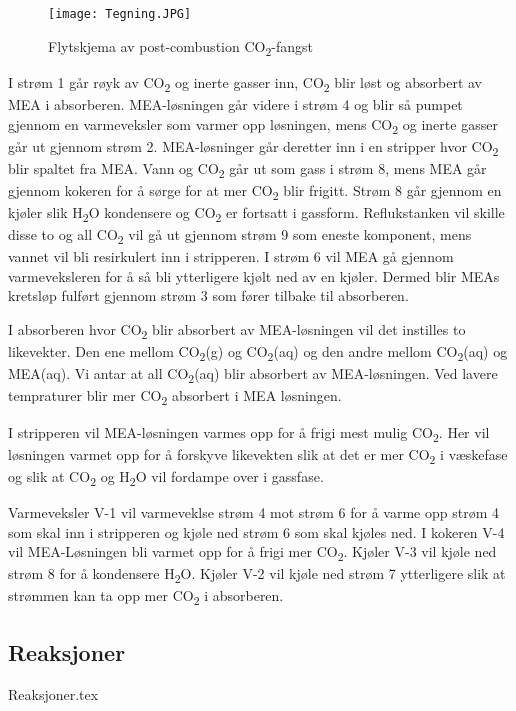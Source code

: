 
\begin{figure}[h]  
    \texttt{[image: Tegning.JPG]}
\centering
\caption{Flytskjema av post-combustion CO\textsubscript{2}-fangst}
\end{figure}

I strøm 1 går røyk av CO\textsubscript{2} og inerte gasser inn, CO\textsubscript{2} blir løst og absorbert av MEA i absorberen. MEA-løsningen går videre i strøm 4 og blir så pumpet gjennom en varmeveksler som varmer opp løsningen, mens CO\textsubscript{2} og inerte gasser går ut gjennom strøm 2. MEA-løsninger går deretter inn i en stripper hvor CO\textsubscript{2} blir spaltet fra MEA. Vann og CO\textsubscript{2} går ut som gass i strøm 8, mens MEA går gjennom kokeren for å sørge for at mer CO\textsubscript{2} blir frigitt. Strøm 8 går gjennom en kjøler slik H\textsubscript{2}O kondensere og CO\textsubscript{2} er fortsatt i gassform. Reflukstanken vil skille disse to og all CO\textsubscript{2} vil gå ut gjennom strøm 9 som eneste komponent, mens vannet vil bli resirkulert inn i stripperen. I strøm 6 vil MEA gå gjennom varmeveksleren for å så bli ytterligere kjølt ned av en kjøler. Dermed blir MEAs kretsløp fulført gjennom strøm 3 som fører tilbake til absorberen. 


I absorberen hvor CO\textsubscript{2} blir absorbert av MEA-løsningen vil det instilles to likevekter. Den ene mellom CO\textsubscript{2}(g) og CO\textsubscript{2}(aq) og den andre mellom CO\textsubscript{2}(aq) og MEA(aq). Vi antar at all CO\textsubscript{2}(aq) blir absorbert av MEA-løsningen. Ved lavere tempraturer blir mer CO\textsubscript{2} absorbert i MEA løsningen.

I stripperen vil MEA-løsningen varmes opp for å frigi mest mulig CO\textsubscript{2}. Her vil løsningen varmet opp for å forskyve likevekten slik at det er mer CO\textsubscript{2} i væskefase og slik at CO\textsubscript{2} og H\textsubscript{2}O vil fordampe over i gassfase.

Varmeveksler V-1 vil varmeveklse strøm 4 mot strøm 6 for å varme opp strøm 4 som skal inn i stripperen og kjøle ned strøm 6 som skal kjøles ned. I kokeren V-4 vil MEA-Løsningen bli varmet opp for å frigi mer CO\textsubscript{2}. Kjøler V-3 vil kjøle ned strøm 8 for å kondensere H\textsubscript{2}O. Kjøler V-2 vil kjøle ned strøm 7 ytterligere slik at strømmen kan ta opp mer CO\textsubscript{2} i absorberen.


\subsection{Reaksjoner}
{Reaksjoner.tex}

